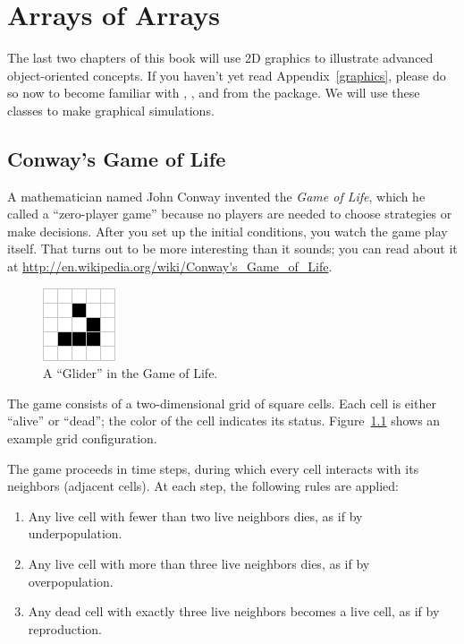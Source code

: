 \chapter{Arrays of Arrays}

The last two chapters of this book will use 2D graphics to illustrate advanced object-oriented concepts.
If you haven't yet read Appendix~\ref{graphics}, please do so now to become familiar with , , and  from the  package.
We will use these classes to make graphical simulations.


\section{Conway's Game of Life}

A mathematician named John Conway invented the {\it Game of Life}, which he called a ``zero-player game'' because no players are needed to choose strategies or make decisions.
After you set up the initial conditions, you watch the game play itself.
That turns out to be more interesting than it sounds; you can read about it at \url{http://en.wikipedia.org/wiki/Conway's_Game_of_Life}.

\begin{figure}[!ht]
\begin{center}
\includegraphics{figs/glider.png}
\caption{A ``Glider'' in the Game of Life.}
\label{fig:glider}
\end{center}
\end{figure}

The game consists of a two-dimensional grid of square cells.
Each cell is either ``alive'' or ``dead''; the color of the cell indicates its status.
Figure~\ref{fig:glider} shows an example grid configuration.


The game proceeds in time steps, during which every cell interacts with its neighbors (adjacent cells).
At each step, the following rules are applied:

\begin{enumerate}
\item Any live cell with fewer than two live neighbors dies, as if by underpopulation.
\item Any live cell with more than three live neighbors dies, as if by overpopulation.
\item Any dead cell with exactly three live neighbors becomes a live cell, as if by reproduction.
\end{enumerate}

